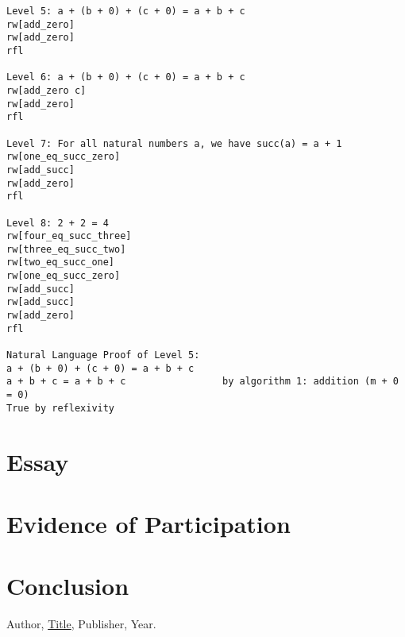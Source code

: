 \documentclass{article}
\theoremstyle{theorem}
\theoremstyle{definition}
\theoremstyle{remark}
\begin{document}
\begin{verbatim}
Level 5: a + (b + 0) + (c + 0) = a + b + c
rw[add_zero]
rw[add_zero]
rfl

Level 6: a + (b + 0) + (c + 0) = a + b + c
rw[add_zero c]
rw[add_zero]
rfl

Level 7: For all natural numbers a, we have succ(a) = a + 1
rw[one_eq_succ_zero]
rw[add_succ]
rw[add_zero]
rfl

Level 8: 2 + 2 = 4
rw[four_eq_succ_three]
rw[three_eq_succ_two]
rw[two_eq_succ_one]
rw[one_eq_succ_zero]
rw[add_succ]
rw[add_succ]
rw[add_zero]
rfl

Natural Language Proof of Level 5:
a + (b + 0) + (c + 0) = a + b + c
a + b + c = a + b + c	              by algorithm 1: addition (m + 0 = 0)
True by reflexivity
\end{verbatim}

\section{Essay}

\section{Evidence of Participation}

\section{Conclusion}\label{conclusion}

\begin{thebibliography}{99}
 Author, \href{https://en.wikipedia.org/wiki/LaTeX}{Title}, Publisher, Year.
\end{thebibliography}
\end{document}
